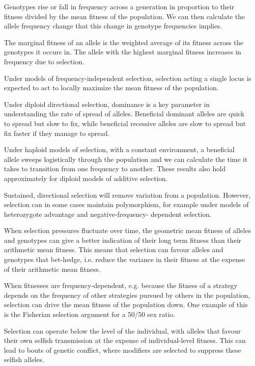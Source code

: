 {\newpage
\begin{ChapterSummary}

 \item Genotypes rise or fall in frequency across a  generation in proportion to their fitness divided by the mean fitness of the population. We can then calculate the allele frequency change that this change in genotype frequencies implies.
 \item The marginal fitness of an allele is the weighted average of its fitness across the genotypes it occurs in. The allele with the highest marginal fitness increases in frequency due to selection.
  \item Under models of frequency-independent selection, selection acting a single locus is expected to act to locally maximize the mean fitness of the population. 
  \item Under diploid directional selection, dominance is a key parameter in understanding the rate of spread of alleles. Beneficial dominant alleles are quick to spread but slow to fix, while beneficial recessive alleles are slow to spread but fix faster if they manage to spread.
  \item Under haploid models of selection, with a constant environment, a beneficial allele sweeps logistically through the population and we can calculate the time it takes to transition from one frequency to another. These results also hold approximately for diploid models of additive selection. 
   \item Sustained, directional selection will remove variation from a population. However, selection can in some cases maintain polymorphism, for example under models of heterozygote advantage and negative-frequency- dependent selection.
    \item When selection pressures fluctuate over time, the geometric mean fitness of alleles and genotypes can give a better indication of their long term fitness than their arithmetic mean
 fitness. This means that selection can favour alleles and genotypes that bet-hedge, i.e. reduce the variance in their fitness at the expense of their arithmetic mean fitness.
      \item When fitnesses are frequency-dependent, e.g. because the fitness of a strategy depends on the frequency of other strategies pursued by others in the population, selection can drive the mean fitness of the population down. One example of this is the Fisherian selection argument for a 50/50 sex ratio. 
     \item Selection can operate below the level of the individual, with alleles that favour their own selfish transmission at the expense of individual-level fitness. This can lead to bouts of genetic conflict, where modifiers are selected to suppress these selfish alleles. 


\end{ChapterSummary}}
